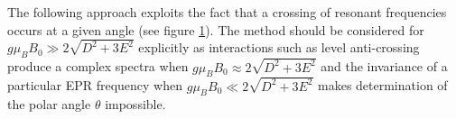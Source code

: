 The following approach exploits the fact that a crossing of resonant frequencies occurs at a given angle (see figure \ref{fig:resonant_crossing_V2}). The method should be considered for $g\mu_B B_0 \gg 2\sqrt{D^2 + 3E^2}$ explicitly as interactions such as level anti-crossing produce a complex spectra \cite{Degen2008} when $g\mu_B B_0 \approx 2\sqrt{D^2 + 3E^2}$ and the invariance of a particular EPR frequency when $g \mu_B B_0 \ll 2 \sqrt{D^2 + 3E^2}$ makes determination of the polar angle $\theta$ impossible. 

\begin{figure}[H]
    \begin{center}
    \end{center}
    \caption{}\label{fig:resonant_crossing_V2}
\end{figure}
